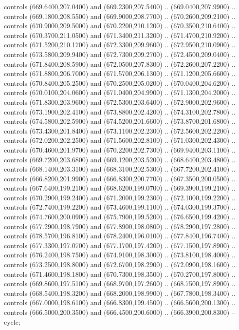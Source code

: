 {\begin{scope}[y=0.80pt, x=0.80pt, yscale=-1, xscale=1, inner sep=0pt, outer sep=0pt, #1]
      controls (669.6400,207.0400) and (669.2300,207.5400) .. (669.0400,207.9900) ..
      controls (669.1800,208.5500) and (669.9000,208.7700) .. (670.2600,209.2100) ..
      controls (670.9000,209.5000) and (670.2200,210.1200) .. (670.3500,210.6400) ..
      controls (670.3700,211.0500) and (671.3400,211.3200) .. (671.4700,210.9200) ..
      controls (671.5200,210.1700) and (672.3300,209.9600) .. (672.9500,210.0900) ..
      controls (673.5800,209.9400) and (672.7300,209.2700) .. (672.4500,209.0400) ..
      controls (671.8400,208.5900) and (672.0500,207.8300) .. (672.2600,207.2200) ..
      controls (671.8800,206.7000) and (671.5700,206.1300) .. (671.1200,205.6600) ..
      controls (670.8400,205.2500) and (670.2500,205.0200) .. (670.0400,204.6200) ..
      controls (670.0100,204.0600) and (671.0400,204.9900) .. (671.1300,204.2000) ..
      controls (671.8300,203.9600) and (672.5300,203.6400) .. (672.9000,202.9600) ..
      controls (673.1900,202.4100) and (673.8800,202.4200) .. (674.3100,202.7800) ..
      controls (674.5800,202.5900) and (674.5200,201.6600) .. (673.8700,201.6800) ..
      controls (673.4300,201.8400) and (673.1100,202.2300) .. (672.5600,202.2200) ..
      controls (672.0200,202.2500) and (671.5600,202.8100) .. (671.0300,202.4300) ..
      controls (670.4600,201.9700) and (670.2200,202.7300) .. (669.9400,203.1100) ..
      controls (669.7200,203.6800) and (669.1200,203.5200) .. (668.6400,203.4800) ..
      controls (668.1400,203.3100) and (668.3100,202.5300) .. (667.7200,202.4100) ..
      controls (666.8200,201.9900) and (666.8300,200.7700) .. (667.3500,200.0500) ..
      controls (667.6400,199.2100) and (668.6200,199.0700) .. (669.3900,199.2100) ..
      controls (670.2900,199.2400) and (671.2000,199.2300) .. (672.1000,199.2200) ..
      controls (672.7400,199.2200) and (673.4600,199.1100) .. (674.0300,199.3700) ..
      controls (674.7600,200.0900) and (675.7900,199.5200) .. (676.6500,199.4200) ..
      controls (677.2900,198.7900) and (677.8900,198.0800) .. (678.2900,197.2800) ..
      controls (678.5700,196.8100) and (678.2400,196.0100) .. (677.8400,196.7400) ..
      controls (677.3300,197.0700) and (677.1700,197.4200) .. (677.1500,197.8900) ..
      controls (676.2400,198.7500) and (674.9100,198.3000) .. (673.8100,198.4000) ..
      controls (673.2500,198.8000) and (672.6700,198.2900) .. (672.0900,198.1600) ..
      controls (671.4600,198.1800) and (670.7300,198.3500) .. (670.2700,197.8000) ..
      controls (669.8600,197.5100) and (668.9700,197.2600) .. (668.7500,197.8900) ..
      controls (668.5400,198.3200) and (668.2000,198.9900) .. (667.7800,198.3400) ..
      controls (667.0000,198.6100) and (666.8300,199.4500) .. (666.5600,200.1300) ..
      controls (666.5000,200.3500) and (666.4500,200.6000) .. (666.3900,200.8300) --
      cycle;


\end{scope}}
